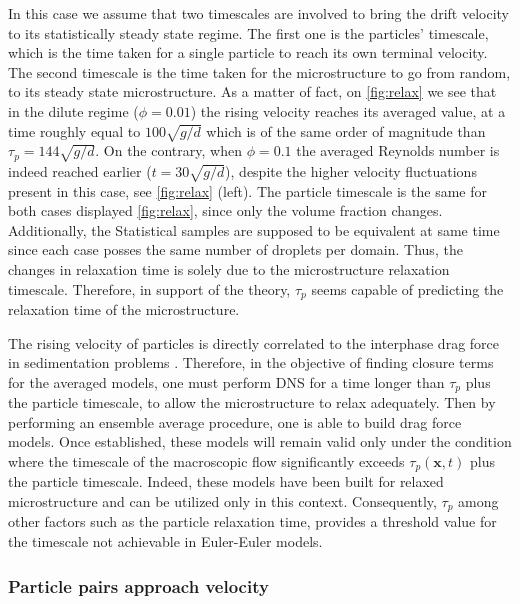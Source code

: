 In this case we assume that two timescales are involved to bring the drift velocity to its statistically steady state regime. 
The first one is the particles' timescale, which is the time taken for a single particle to reach its own terminal velocity. 
The second timescale is the time taken for the microstructure to go from random, to its steady state microstructure. 
As a matter of fact, on \ref{fig:relax} we see that in the dilute regime ($\phi=0.01$) the rising velocity reaches its averaged value, at a time roughly equal to $100\sqrt{g/d}$ which is of the same order of magnitude than $\tau_p = 144\sqrt{g/d}$. 
On the contrary, when $\phi =0.1$ the averaged Reynolds number is indeed reached earlier ($t = 30\sqrt{g/d}$), despite the higher velocity fluctuations present in this case, see \ref{fig:relax} (left). 
The particle timescale is the same for both cases displayed \ref{fig:relax}, since only the volume fraction changes.
Additionally, the Statistical samples are supposed to be equivalent at same time since each  case posses the same number of droplets per domain. 
Thus, the changes in relaxation time is solely due to the microstructure relaxation timescale. 
Therefore, in support of the theory, $\tau_p$ seems capable of predicting the relaxation time of the microstructure.


The rising velocity of particles is directly correlated to the interphase drag force in sedimentation problems \citep{jackson1997locally}. 
Therefore, in the objective of finding closure terms for the averaged models, one must perform DNS for a time longer than $\tau_p$ plus the particle timescale, to allow the microstructure to relax adequately.
Then by performing an ensemble average procedure, one is able to build drag force models. 
Once established, these models will remain valid only under the condition where the timescale of the macroscopic flow significantly exceeds $\tau_p(\textbf{x},t)$ plus the particle timescale.
Indeed, these models have been built for relaxed microstructure and can be utilized only in this context.
Consequently, $\tau_p$ among other factors such as the particle relaxation time, provides a threshold value for the timescale not achievable in Euler-Euler models. 

\subsubsection*{Particle pairs approach velocity}

